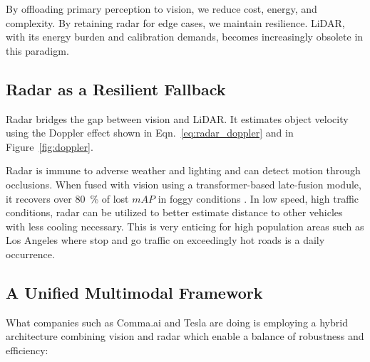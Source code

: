 \documentclass[12pt]{article}
\begin{document}
By offloading primary perception to vision, we reduce cost, energy, and complexity. By retaining radar for edge cases, we maintain resilience. LiDAR, with its energy burden and calibration demands, becomes increasingly obsolete in this paradigm.


\subsection{Radar as a Resilient Fallback}

Radar bridges the gap between vision and LiDAR. It estimates object velocity
using the Doppler effect shown in Eqn.~\ref{eq:radar_doppler} and in
Figure~\ref{fig:doppler}.

Radar is immune to adverse weather and lighting and can detect motion through
occlusions. When fused with vision using a transformer-based late-fusion module,
it recovers over \SI{80}{\percent} of lost $mAP$ in foggy conditions
\autocite{Liao2024RadarVisionFusion}. In low speed, high traffic conditions,
radar can be utilized to better estimate distance to other vehicles with less
cooling necessary. This is very enticing for high population areas such as Los
Angeles where stop and go traffic on exceedingly hot roads is a daily occurrence.

\subsection{A Unified Multimodal Framework}

What companies such as Comma.ai and Tesla are doing is employing a hybrid
architecture combining vision and radar which enable a balance of robustness and efficiency:
\end{document}
